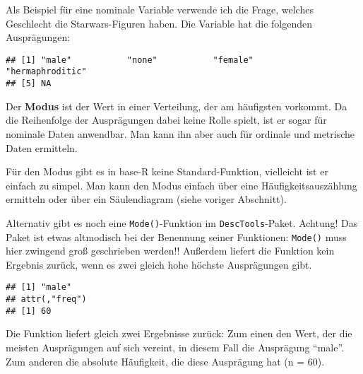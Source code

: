 \documentclass[
]{book}
\newenvironment{Shaded}{\begin{snugshade}}{\end{snugshade}}
\newcommand{\AttributeTok}[1]{\textcolor[rgb]{0.77,0.63,0.00}{#1}}
\newcommand{\ConstantTok}[1]{\textcolor[rgb]{0.00,0.00,0.00}{#1}}
\newcommand{\FunctionTok}[1]{\textcolor[rgb]{0.00,0.00,0.00}{#1}}
\newcommand{\NormalTok}[1]{#1}
\newcommand{\SpecialCharTok}[1]{\textcolor[rgb]{0.00,0.00,0.00}{#1}}
\begin{document}
Als Beispiel für eine nominale Variable verwende ich die Frage, welches Geschlecht die Starwars-Figuren haben. Die Variable hat die folgenden Ausprägungen:

\begin{Shaded}
\end{Shaded}

\begin{verbatim}
## [1] "male"           "none"           "female"         "hermaphroditic"
## [5] NA
\end{verbatim}

Der \textbf{Modus} ist der Wert in einer Verteilung, der am häufigsten vorkommt. Da die Reihenfolge der Ausprägungen dabei keine Rolle spielt, ist er sogar für nominale Daten anwendbar. Man kann ihn aber auch für ordinale und metrische Daten ermitteln.

Für den Modus gibt es in base-R keine Standard-Funktion, vielleicht ist er einfach zu simpel. Man kann den Modus einfach über eine Häufigkeitsauszählung ermitteln oder über ein Säulendiagram (siehe voriger Abschnitt).

Alternativ gibt es noch eine \texttt{Mode()}-Funktion im \texttt{DescTools}-Paket. Achtung! Das Paket ist etwas altmodisch bei der Benennung seiner Funktionen: \texttt{Mode()} muss hier zwingend groß geschrieben werden!! Außerdem liefert die Funktion kein Ergebnis zurück, wenn es zwei gleich hohe höchste Ausprägungen gibt.

\begin{Shaded}
\end{Shaded}

\begin{verbatim}
## [1] "male"
## attr(,"freq")
## [1] 60
\end{verbatim}

Die Funktion liefert gleich zwei Ergebnisse zurück: Zum einen den Wert, der die meisten Ausprägungen auf sich vereint, in diesem Fall die Ausprägung ``male''. Zum anderen die absolute Häufigkeit, die diese Ausprägung hat (n = 60).
\end{document}
